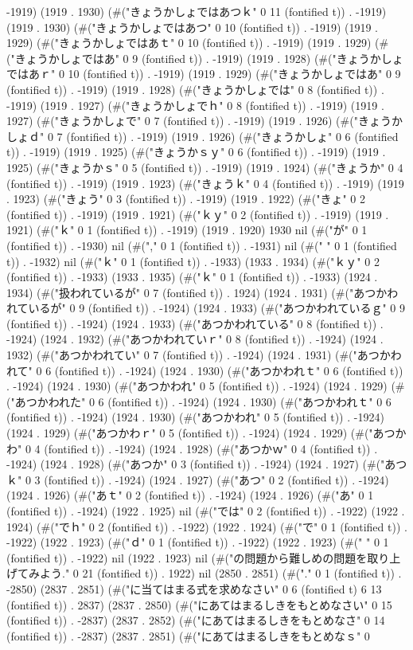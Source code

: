 -1919) (1919 . 1930) (#("きょうかしょではあつｋ" 0 11 (fontified t)) . -1919) (1919 . 1930) (#("きょうかしょではあつ" 0 10 (fontified t)) . -1919) (1919 . 1929) (#("きょうかしょではあｔ" 0 10 (fontified t)) . -1919) (1919 . 1929) (#("きょうかしょではあ" 0 9 (fontified t)) . -1919) (1919 . 1928) (#("きょうかしょではあｒ" 0 10 (fontified t)) . -1919) (1919 . 1929) (#("きょうかしょではあ" 0 9 (fontified t)) . -1919) (1919 . 1928) (#("きょうかしょでは" 0 8 (fontified t)) . -1919) (1919 . 1927) (#("きょうかしょでｈ" 0 8 (fontified t)) . -1919) (1919 . 1927) (#("きょうかしょで" 0 7 (fontified t)) . -1919) (1919 . 1926) (#("きょうかしょｄ" 0 7 (fontified t)) . -1919) (1919 . 1926) (#("きょうかしょ" 0 6 (fontified t)) . -1919) (1919 . 1925) (#("きょうかｓｙ" 0 6 (fontified t)) . -1919) (1919 . 1925) (#("きょうかｓ" 0 5 (fontified t)) . -1919) (1919 . 1924) (#("きょうか" 0 4 (fontified t)) . -1919) (1919 . 1923) (#("きょうｋ" 0 4 (fontified t)) . -1919) (1919 . 1923) (#("きょう" 0 3 (fontified t)) . -1919) (1919 . 1922) (#("きょ" 0 2 (fontified t)) . -1919) (1919 . 1921) (#("ｋｙ" 0 2 (fontified t)) . -1919) (1919 . 1921) (#("ｋ" 0 1 (fontified t)) . -1919) (1919 . 1920) 1930 nil (#("が" 0 1 (fontified t)) . -1930) nil (#("," 0 1 (fontified t)) . -1931) nil (#(" " 0 1 (fontified t)) . -1932) nil (#("ｋ" 0 1 (fontified t)) . -1933) (1933 . 1934) (#("ｋｙ" 0 2 (fontified t)) . -1933) (1933 . 1935) (#("ｋ" 0 1 (fontified t)) . -1933) (1924 . 1934) (#("扱われているが" 0 7 (fontified t)) . 1924) (1924 . 1931) (#("あつかわれているが" 0 9 (fontified t)) . -1924) (1924 . 1933) (#("あつかわれているｇ" 0 9 (fontified t)) . -1924) (1924 . 1933) (#("あつかわれている" 0 8 (fontified t)) . -1924) (1924 . 1932) (#("あつかわれていｒ" 0 8 (fontified t)) . -1924) (1924 . 1932) (#("あつかわれてい" 0 7 (fontified t)) . -1924) (1924 . 1931) (#("あつかわれて" 0 6 (fontified t)) . -1924) (1924 . 1930) (#("あつかわれｔ" 0 6 (fontified t)) . -1924) (1924 . 1930) (#("あつかわれ" 0 5 (fontified t)) . -1924) (1924 . 1929) (#("あつかわれた" 0 6 (fontified t)) . -1924) (1924 . 1930) (#("あつかわれｔ" 0 6 (fontified t)) . -1924) (1924 . 1930) (#("あつかわれ" 0 5 (fontified t)) . -1924) (1924 . 1929) (#("あつかわｒ" 0 5 (fontified t)) . -1924) (1924 . 1929) (#("あつかわ" 0 4 (fontified t)) . -1924) (1924 . 1928) (#("あつかｗ" 0 4 (fontified t)) . -1924) (1924 . 1928) (#("あつか" 0 3 (fontified t)) . -1924) (1924 . 1927) (#("あつｋ" 0 3 (fontified t)) . -1924) (1924 . 1927) (#("あつ" 0 2 (fontified t)) . -1924) (1924 . 1926) (#("あｔ" 0 2 (fontified t)) . -1924) (1924 . 1926) (#("あ" 0 1 (fontified t)) . -1924) (1922 . 1925) nil (#("では" 0 2 (fontified t)) . -1922) (1922 . 1924) (#("でｈ" 0 2 (fontified t)) . -1922) (1922 . 1924) (#("で" 0 1 (fontified t)) . -1922) (1922 . 1923) (#("ｄ" 0 1 (fontified t)) . -1922) (1922 . 1923) (#(" " 0 1 (fontified t)) . -1922) nil (1922 . 1923) nil (#("の問題から難しめの問題を取り上げてみよう." 0 21 (fontified t)) . 1922) nil (2850 . 2851) (#("." 0 1 (fontified t)) . -2850) (2837 . 2851) (#("に当てはまる式を求めなさい" 0 6 (fontified t) 6 13 (fontified t)) . 2837) (2837 . 2850) (#("にあてはまるしきをもとめなさい" 0 15 (fontified t)) . -2837) (2837 . 2852) (#("にあてはまるしきをもとめなさ" 0 14 (fontified t)) . -2837) (2837 . 2851) (#("にあてはまるしきをもとめなｓ" 0 